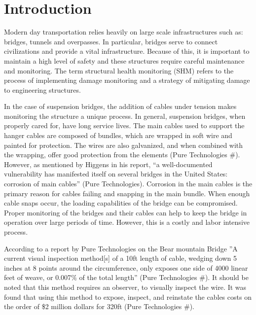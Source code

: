 
\chapter{Introduction}

Modern day transportation relies heavily on large scale infrastructures such as: bridges, tunnels and overpasses.  In particular, bridges serve to connect civilizations and provide a vital infrastructure.  Because of this, it is important to maintain a high level of safety and these structures require careful maintenance and monitoring.  The term structural health monitoring (SHM) refers to the process of implementing damage monitoring and a strategy of mitigating damage to engineering structures. 

In the case of suspension bridges, the addition of cables under tension makes monitoring the structure a unique process.  In general, suspension bridges, when properly cared for, have long service lives.  The main cables used to support the hanger cables are composed of bundles, which are wrapped in soft wire and painted for protection.  The wires are also galvanized, and when combined with the wrapping, offer good protection from the elements (Pure Technologies $\#$).  However, as mentioned by Higgens in his report, “a well-documented vulnerability has manifested itself on several bridges in the United States: corrosion of main cables” (Pure Technologies).  Corrosion in the main cables is the primary reason for cables failing and snapping in the main bundle.  When enough cable snaps occur, the loading capabilities of the bridge can be compromised.  Proper monitoring of the bridges and their cables can help to keep the bridge in operation over large periods of time.  However, this is a costly and labor intensive process.

According to a report by Pure Technologies on the Bear mountain Bridge ”A current visual inspection method[s] of a 10ft length of cable, wedging down 5 inches at 8 points around the circumference, only exposes one side of 4000 linear feet of weave, or 0.007$\%$ of the total length” (Pure Technologies $\#$).  It should be noted that this method requires an observer, to visually inspect the wire.  It was found that using this method to expose, inspect, and reinstate the cables costs on the order of \$2 million dollars for 320ft (Pure Technologies $\#$).  

